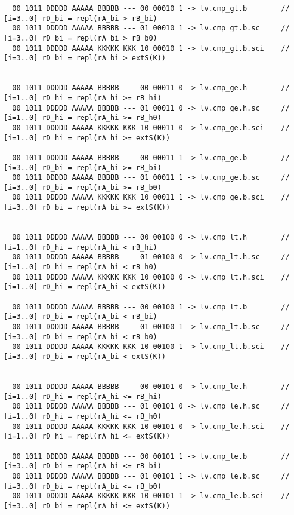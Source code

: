 \begin{landscape}
\begin{verbatim}
  00 1011 DDDDD AAAAA BBBBB --- 00 00010 1 -> lv.cmp_gt.b        // [i=3..0] rD_bi = repl(rA_bi > rB_bi)
  00 1011 DDDDD AAAAA BBBBB --- 01 00010 1 -> lv.cmp_gt.b.sc     // [i=3..0] rD_bi = repl(rA_bi > rB_b0)
  00 1011 DDDDD AAAAA KKKKK KKK 10 00010 1 -> lv.cmp_gt.b.sci    // [i=3..0] rD_bi = repl(rA_bi > extS(K))


  00 1011 DDDDD AAAAA BBBBB --- 00 00011 0 -> lv.cmp_ge.h        // [i=1..0] rD_hi = repl(rA_hi >= rB_hi)
  00 1011 DDDDD AAAAA BBBBB --- 01 00011 0 -> lv.cmp_ge.h.sc     // [i=1..0] rD_hi = repl(rA_hi >= rB_h0)
  00 1011 DDDDD AAAAA KKKKK KKK 10 00011 0 -> lv.cmp_ge.h.sci    // [i=1..0] rD_hi = repl(rA_hi >= extS(K))

  00 1011 DDDDD AAAAA BBBBB --- 00 00011 1 -> lv.cmp_ge.b        // [i=3..0] rD_bi = repl(rA_bi >= rB_bi)
  00 1011 DDDDD AAAAA BBBBB --- 01 00011 1 -> lv.cmp_ge.b.sc     // [i=3..0] rD_bi = repl(rA_bi >= rB_b0)
  00 1011 DDDDD AAAAA KKKKK KKK 10 00011 1 -> lv.cmp_ge.b.sci    // [i=3..0] rD_bi = repl(rA_bi >= extS(K))


  00 1011 DDDDD AAAAA BBBBB --- 00 00100 0 -> lv.cmp_lt.h        // [i=1..0] rD_hi = repl(rA_hi < rB_hi)
  00 1011 DDDDD AAAAA BBBBB --- 01 00100 0 -> lv.cmp_lt.h.sc     // [i=1..0] rD_hi = repl(rA_hi < rB_h0)
  00 1011 DDDDD AAAAA KKKKK KKK 10 00100 0 -> lv.cmp_lt.h.sci    // [i=1..0] rD_hi = repl(rA_hi < extS(K))

  00 1011 DDDDD AAAAA BBBBB --- 00 00100 1 -> lv.cmp_lt.b        // [i=3..0] rD_bi = repl(rA_bi < rB_bi)
  00 1011 DDDDD AAAAA BBBBB --- 01 00100 1 -> lv.cmp_lt.b.sc     // [i=3..0] rD_bi = repl(rA_bi < rB_b0)
  00 1011 DDDDD AAAAA KKKKK KKK 10 00100 1 -> lv.cmp_lt.b.sci    // [i=3..0] rD_bi = repl(rA_bi < extS(K))


  00 1011 DDDDD AAAAA BBBBB --- 00 00101 0 -> lv.cmp_le.h        // [i=1..0] rD_hi = repl(rA_hi <= rB_hi)
  00 1011 DDDDD AAAAA BBBBB --- 01 00101 0 -> lv.cmp_le.h.sc     // [i=1..0] rD_hi = repl(rA_hi <= rB_h0)
  00 1011 DDDDD AAAAA KKKKK KKK 10 00101 0 -> lv.cmp_le.h.sci    // [i=1..0] rD_hi = repl(rA_hi <= extS(K))

  00 1011 DDDDD AAAAA BBBBB --- 00 00101 1 -> lv.cmp_le.b        // [i=3..0] rD_bi = repl(rA_bi <= rB_bi)
  00 1011 DDDDD AAAAA BBBBB --- 01 00101 1 -> lv.cmp_le.b.sc     // [i=3..0] rD_bi = repl(rA_bi <= rB_b0)
  00 1011 DDDDD AAAAA KKKKK KKK 10 00101 1 -> lv.cmp_le.b.sci    // [i=3..0] rD_bi = repl(rA_bi <= extS(K))
\end{verbatim}



\end{landscape}
